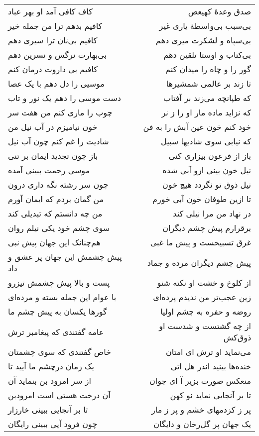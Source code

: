 \begin{center}
\begin{longtable}{l p{0.5cm} r}
\\
کاف کافی آمد او بهر عباد
&&
صدق وعدهٔ کهیعص
\\
کافیم بدهم ترا من جمله خیر
&&
بی‌سبب بی‌واسطهٔ یاری غیر
\\
کافیم بی‌نان ترا سیری دهم
&&
بی‌سپاه و لشکرت میری دهم
\\
بی‌بهارت نرگس و نسرین دهم
&&
بی‌کتاب و اوستا تلقین دهم
\\
کافیم بی داروت درمان کنم
&&
گور را و چاه را میدان کنم
\\
موسیی را دل دهم با یک عصا
&&
تا زند بر عالمی شمشیرها
\\
دست موسی را دهم یک نور و تاب
&&
که طپانچه می‌زند بر آفتاب
\\
چوب را ماری کنم من هفت سر
&&
که نزاید ماده مار او را ز نر
\\
خون نیامیزم در آب نیل من
&&
خود کنم خون عین آبش را به فن
\\
شادیت را غم کنم چون آب نیل
&&
که نیابی سوی شادیها سبیل
\\
باز چون تجدید ایمان بر تنی
&&
باز از فرعون بیزاری کنی
\\
موسی رحمت ببینی آمده
&&
نیل خون بینی ازو آبی شده
\\
چون سر رشته نگه داری درون
&&
نیل ذوق تو نگردد هیچ خون
\\
من گمان بردم که ایمان آورم
&&
تا ازین طوفان خون آبی خورم
\\
من چه دانستم که تبدیلی کند
&&
در نهاد من مرا نیلی کند
\\
سوی چشم خود یکی نیلم روان
&&
برقرارم پیش چشم دیگران
\\
هم‌چنانک این جهان پیش نبی
&&
غرق تسبیحست و پیش ما غبی
\\
پیش چشمش این جهان پر عشق و داد
&&
پیش چشم دیگران مرده و جماد
\\
پست و بالا پیش چشمش تیزرو
&&
از کلوخ و خشت او نکته شنو
\\
با عوام این جمله بسته و مرده‌ای
&&
زین عجب‌تر من ندیدم پرده‌ای
\\
گورها یکسان به پیش چشم ما
&&
روضه و حفره به چشم اولیا
\\
عامه گفتندی که پیغامبر ترش
&&
از چه گشتست و شدست او ذوق‌کش
\\
خاص گفتندی که سوی چشمتان
&&
می‌نماید او ترش ای امتان
\\
یک زمان درچشم ما آیید تا
&&
خنده‌ها بینید اندر هل اتی
\\
از سر امرود بن بنماید آن
&&
منعکس صورت بزیر آ ای جوان
\\
آن درخت هستی است امرودبن
&&
تا بر آنجایی نماید نو کهن
\\
تا بر آنجایی ببینی خارزار
&&
پر ز کزدمهای خشم و پر ز مار
\\
چون فرود آیی ببینی رایگان
&&
یک جهان پر گل‌رخان و دایگان
\\
\end{longtable}
\end{center}
